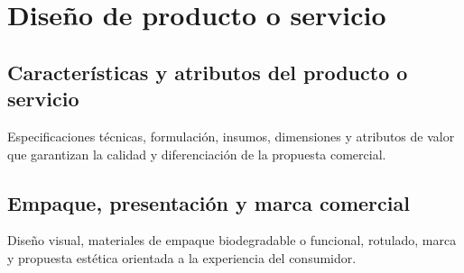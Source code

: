 \section{Diseño de producto o servicio}
\label{sec:diseno_producto}

\subsection{Características y atributos del producto o servicio}
Especificaciones técnicas, formulación, insumos, dimensiones y atributos de valor que garantizan la calidad y diferenciación de la propuesta comercial.

\subsection{Empaque, presentación y marca comercial}
Diseño visual, materiales de empaque biodegradable o funcional, rotulado, marca y propuesta estética orientada a la experiencia del consumidor.


